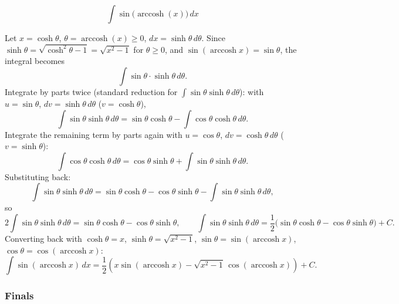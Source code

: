 \begin{questions}
\question
\[
\int \sin\big(\operatorname{arccosh}(x)\big)\,dx
\]
\begin{solution}
Let $x=\cosh\theta$, $\theta=\operatorname{arccosh}(x)\ge0$, $dx=\sinh\theta\,d\theta$. Since $\sinh\theta=\sqrt{\cosh^2\theta-1}=\sqrt{x^2-1}$ for $\theta\ge0$, and $\sin(\operatorname{arccosh}x)=\sin\theta$, the integral becomes
\[
\int \sin\theta\cdot\sinh\theta\,d\theta.
\]
Integrate by parts twice (standard reduction for $\int \sin\theta\sinh\theta\,d\theta$): with $u=\sin\theta$, $dv=\sinh\theta\,d\theta$ ($v=\cosh\theta$),
\[
\int\sin\theta\sinh\theta\,d\theta=\sin\theta\cosh\theta-\int\cos\theta\cosh\theta\,d\theta.
\]
Integrate the remaining term by parts again with $u=\cos\theta$, $dv=\cosh\theta\,d\theta$ ($v=\sinh\theta$):
\[
\int\cos\theta\cosh\theta\,d\theta=\cos\theta\sinh\theta+\int\sin\theta\sinh\theta\,d\theta.
\]
Substituting back:
\[
\int\sin\theta\sinh\theta\,d\theta=\sin\theta\cosh\theta-\cos\theta\sinh\theta-\int\sin\theta\sinh\theta\,d\theta,
\]
so
\[
2\int\sin\theta\sinh\theta\,d\theta=\sin\theta\cosh\theta-\cos\theta\sinh\theta,\qquad \int\sin\theta\sinh\theta\,d\theta=\frac12\big(\sin\theta\cosh\theta-\cos\theta\sinh\theta\big)+C.
\]
Converting back with $\cosh\theta=x$, $\sinh\theta=\sqrt{x^2-1}$, $\sin\theta=\sin(\operatorname{arccosh}x)$, $\cos\theta=\cos(\operatorname{arccosh}x)$:
\[
\int\sin(\operatorname{arccosh}x)\,dx=\frac12\left(x\sin(\operatorname{arccosh}x)-\sqrt{x^2-1}\,\cos(\operatorname{arccosh}x)\right)+C.
\]
\end{solution}

\end{questions}

\subsubsection*{Finals}
 
